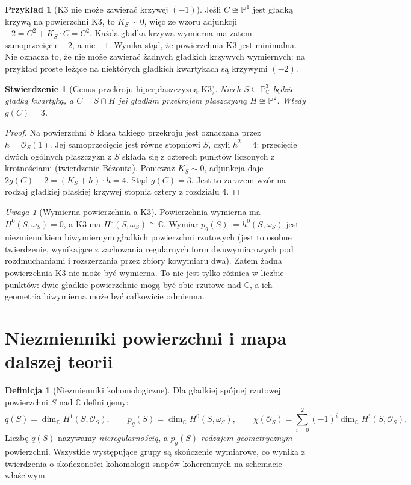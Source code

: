 \documentclass[11pt,a4paper,openany]{report}
\numberwithin{equation}{section}
\theoremstyle{plain}
\newtheorem{stwierdzenie}[twierdzenie]{Stwierdzenie}
\theoremstyle{definition}
\newtheorem{definicja}[twierdzenie]{Definicja}
\newtheorem{przyklad}[twierdzenie]{Przykład}
\theoremstyle{remark}
\newtheorem{uwaga}[twierdzenie]{Uwaga}
\newcommand{\C}{\mathbb C}
\newcommand{\PP}{\mathbb P}
\begin{document}
\begin{przyklad}[K3 nie może zawierać krzywej $(-1)$]
\label{prz:ga6-k3-no-minus1}
Jeśli $C\cong\PP^1$ jest gładką krzywą na powierzchni K3,
to $K_S\sim0$, więc ze wzoru adjunkcji
$-2=C^2+K_S\cdot C=C^2$.
Każda gładka krzywa wymierna ma zatem
samoprzecięcie $-2$, a nie $-1$. Wynika stąd,
że powierzchnia K3 jest minimalna. Nie oznacza to,
że nie może zawierać żadnych gładkich krzywych
wymiernych: na przykład proste leżące na niektórych
gładkich kwartykach są krzywymi $(-2)$.
\end{przyklad}

\begin{stwierdzenie}[Genus przekroju hiperpłaszczyzną K3]
\label{st:ga6-quartic-plane-section}
Niech $S\subseteq\PP^3_\C$ będzie gładką kwartyką,
a $C=S\cap H$ jej gładkim przekrojem płaszczyzną
$H\cong\PP^2$. Wtedy $g(C)=3$.
\end{stwierdzenie}
\begin{proof}
Na powierzchni $S$ klasa takiego przekroju
jest oznaczana przez $h=\mathcal O_S(1)$.
Jej samoprzecięcie jest równe stopniowi $S$,
czyli $h^2=4$: przecięcie dwóch ogólnych
płaszczyzn z $S$ składa się z czterech punktów
liczonych z krotnościami (twierdzenie Bézouta).
Ponieważ $K_S\sim0$, adjunkcja daje
$2g(C)-2=(K_S+h)\cdot h=4$.
Stąd $g(C)=3$. Jest to zarazem wzór na rodzaj
gładkiej płaskiej krzywej stopnia cztery z rozdziału 4.
\end{proof}

\begin{uwaga}[Wymierna powierzchnia a K3]
Powierzchnia wymierna ma $H^0(S,\omega_S)=0$,
a K3 ma $H^0(S,\omega_S)\cong\C$.
Wymiar $p_g(S):=h^0(S,\omega_S)$ jest
niezmiennikiem biwymiernym gładkich powierzchni
rzutowych (jest to osobne twierdzenie, wynikające
z zachowania regularnych form dwuwymiarowych
pod rozdmuchaniami i rozszerzania przez zbiory
kowymiaru dwa). Zatem żadna powierzchnia K3
nie może być wymierna.
To nie jest tylko różnica w liczbie punktów:
dwie gładkie powierzchnie mogą być obie rzutowe
nad $\C$, a ich geometria biwymierna może być
całkowicie odmienna.
\end{uwaga}

\section{Niezmienniki powierzchni i mapa dalszej teorii}
\label{sec:ga6-invariants}

\begin{definicja}[Niezmienniki kohomologiczne]
Dla gładkiej spójnej rzutowej powierzchni $S$ nad
$\C$ definiujemy:
\[
 q(S)=\dim_{\C}H^1(S,\mathcal O_S),\qquad
 p_g(S)=\dim_{\C}H^0(S,\omega_S),\qquad
 \chi(\mathcal O_S)=\sum_{i=0}^2(-1)^i
 \dim_{\C}H^i(S,\mathcal O_S).
\]
Liczbę $q(S)$ nazywamy \emph{nieregularnością},
a $p_g(S)$ \emph{rodzajem geometrycznym} powierzchni.
Wszystkie występujące grupy są skończenie wymiarowe,
co wynika z twierdzenia o skończoności kohomologii
snopów koherentnych na schemacie właściwym.
\end{definicja}
\end{document}
